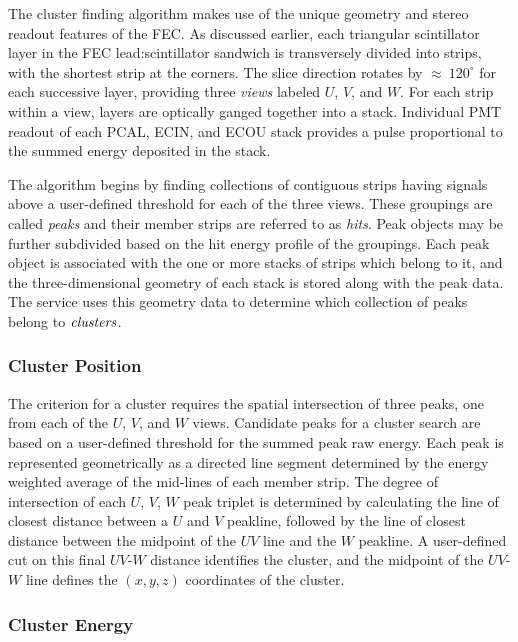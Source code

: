 \documentclass[3p,times,twocolumn]{elsarticle}
\begin{document}
The cluster finding algorithm makes use of the unique geometry and stereo readout features of the FEC. As discussed
earlier, each triangular scintillator layer in the FEC lead:scintillator sandwich is transversely divided into strips, with the
shortest strip at the corners. The slice direction rotates by $\approx~120^{\circ}$ for each successive layer, providing
three {\it views} labeled $U$, $V$, and $W$.  For each strip within a view, layers are optically ganged together into a
stack.  Individual PMT readout of each PCAL, ECIN, and ECOU stack provides a pulse proportional to the summed energy
deposited in the stack.

The algorithm begins by finding collections of contiguous strips having signals above a user-defined threshold for each of
the three views. These groupings are called {\it peaks} and their member strips are referred to as {\it hits}.  Peak objects
may be further subdivided based on the hit energy profile of the groupings.  Each peak object is associated with the one or
more stacks of strips which belong to it, and the three-dimensional geometry of each stack is stored along with the peak
data. The service uses this geometry data to determine which collection of peaks belong to $\it{clusters}$.

\subsubsection {Cluster Position}

The criterion for a cluster requires the spatial intersection of three peaks, one from each of the $U$, $V$, and $W$ views.
Candidate peaks for a cluster search are based on a user-defined threshold for the summed peak raw energy.  Each peak is
represented geometrically as a directed line segment determined by the energy weighted average of the mid-lines of each
member strip.   The degree of intersection of each $U$, $V$, $W$ peak triplet is determined by calculating the line of
closest distance between a $U$ and $V$ peakline, followed by the line of closest distance between the midpoint of the $UV$
line and the $W$ peakline.  A user-defined cut on this final $UV$-$W$ distance identifies the cluster, and the midpoint of
the $UV$-$W$ line defines the $(x,y,z)$ coordinates of the cluster.

\subsubsection {Cluster Energy}
\end{document}
